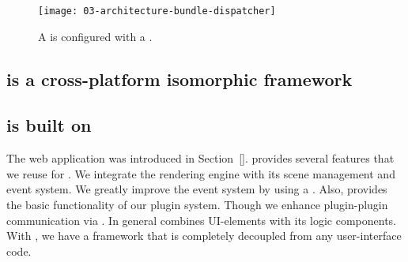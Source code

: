 \documentclass[../../ClassicThesis.tex]{subfiles}
\begin{document}
\begin{figure}
  \centering
  \texttt{[image: 03-architecture-bundle-dispatcher]}
  \caption{A  is configured with a .}
  \label{fig:bundle-dispatcher}
\end{figure}






\subsection{{\convertify} is a cross-platform isomorphic framework}
\label{sec:convertify-is-isomorphic}





\subsection{{\convertify} is built on {\brickify}}
\label{sec:brickify-comparison}

The web application {\brickify} was introduced in
Section~\ref{}. {\brickify} provides several
features that we reuse for {\convertify}. We integrate the rendering
engine with its scene management and event system. We greatly improve
the event system by using a . Also, {\brickify}
provides the basic functionality of our plugin system. Though we
enhance plugin-plugin communication via . In general
{\brickify} combines UI-elements with its logic components. With
{\convertify}, we have a framework that is completely decoupled from
any user-interface code.
\end{document}
